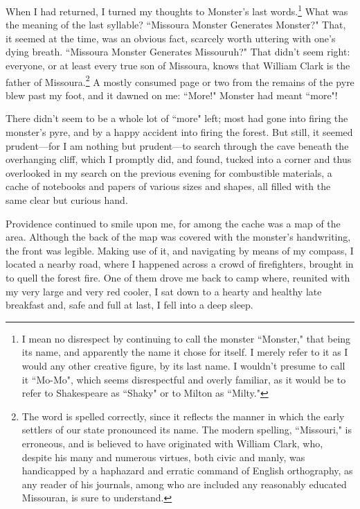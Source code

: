 \par
When I had returned, I turned my thoughts to Monster's last words.\footnote{I mean no disrespect by continuing to call the monster ``Monster," that being its name, and apparently the name it chose for itself.  I merely refer to it as I would any other creative figure, by its last name.  I wouldn't presume to call it ``Mo-Mo", which seems disrespectful and overly familiar, as it would be to refer to Shakespeare as ``Shaky" or to Milton as ``Milty."}  What was the meaning of the last syllable?  ``Missoura Monster Generates Monster?"  That, it seemed at the time, was an obvious fact, scarcely worth uttering with one's dying breath.  ``Missoura Monster Generates Missouruh?"  That didn't seem right: everyone, or at least every true son of Missoura, knows that William Clark is the father of Missoura.\footnote{The word is spelled correctly, since it reflects the manner in which the early settlers of our state pronounced its name.  The modern spelling, ``Missouri," is erroneous, and is believed to have originated with William Clark, who, despite his many and numerous virtues, both civic and manly, was handicapped by a haphazard and erratic command of English orthography, as any reader of his journals, among who are included any reasonably educated Missouran, is sure to understand.}  A mostly consumed page or two from the remains of the pyre blew past my foot, and it dawned on me: ``More!" Monster had meant ``more"!
\par
There didn't seem to be a whole lot of ``more" left; most had gone into firing the monster's pyre, and by a happy accident into firing the forest.  But still, it seemed prudent—for I am nothing but prudent—to search through the cave beneath the overhanging cliff, which I promptly did, and found, tucked into a corner and thus overlooked in my search on the previous evening for combustible materials, a cache of notebooks and papers of various sizes and shapes, all filled with the same clear but curious hand.
\par
Providence continued to smile upon me, for among the cache was a map of the area.  Although the back of the map was covered with the monster's handwriting, the front was legible.  Making use of it, and navigating by means of my compass, I located a nearby road, where I happened across a crowd of firefighters, brought in to quell the forest fire.  One of them drove me back to camp where, reunited with my very large and very red cooler, I sat down to a hearty and healthy late breakfast and, safe and full at last, I fell into a deep sleep.
